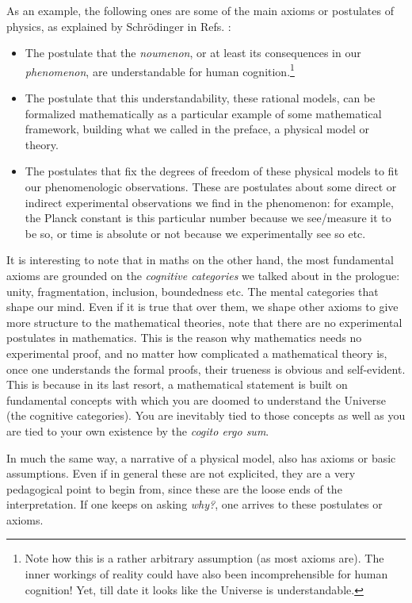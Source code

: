 \documentclass[11pt, a4paper]{article} %
\DeclareRobustCommand{\mybox}[2][gray!10]{%
\begin{tcolorbox}[   %
        left=0.2cm,
        right=0.2cm,
        top=0.15cm,
        bottom=0.15cm,
        colback=#1,
        colframe=#1,
        width=\dimexpr\textwidth\relax, 
        enlarge left by=0mm,
        boxsep=5pt,
        arc=0pt,outer arc=0pt,
        ]
        #2
\end{tcolorbox}
}
\begin{document}
\mybox{As an example, the following ones are some of the main axioms or postulates of physics, as explained by Schrödinger in Refs. \citeA{schrodinger:mind, schrodinger:nature}:\vspace{-0.1cm}
\begin{itemize}
\item The postulate that the {\em noumenon}, or at least its consequences in our {\em phenomenon}, are understandable for human cognition.\footnote{Note how this is a rather arbitrary assumption (as most axioms are). The inner workings of reality could have also been incomprehensible for human cognition! Yet, till date it looks like the Universe is understandable. } 

\item The postulate that this understandability, these rational models, can be formalized mathematically as a particular example of some mathematical framework, building what we called in the preface, a physical model or theory.

\item The postulates that fix the degrees of freedom of these physical models to fit our phenomenologic observations. These are postulates about some direct or indirect experimental observations we find in the phenomenon: for example, the Planck constant is this particular number because we see/measure it to be so, or time is absolute or not because we experimentally see so etc.\vspace{-0.1cm}
\end{itemize}

It is interesting to note that in maths on the other hand, the most fundamental axioms are grounded on the {\em cognitive categories} we talked about in the prologue: unity, fragmentation, inclusion, boundedness etc. The mental categories that shape our mind. Even if it is true that over them, we shape other axioms to give more structure to the mathematical theories, note that there are no experimental postulates in mathematics. This is the reason why mathematics needs no experimental proof, and no matter how complicated a mathematical theory is, once one understands the formal proofs, their trueness is obvious and self-evident. This is because in its last resort, a mathematical statement is built on fundamental concepts with which you are doomed to understand the Universe (the cognitive categories). You are inevitably tied to those concepts as well as you are tied to your own existence by the {\em cogito ergo sum}.}

In much the same way, a narrative of a physical model, also has axioms or basic assumptions. Even if in general these are not explicited, they are a very pedagogical point to begin from, since these are the loose ends of the interpretation. If one keeps on asking {\em why?}, one arrives to these postulates or axioms.
\end{document}
